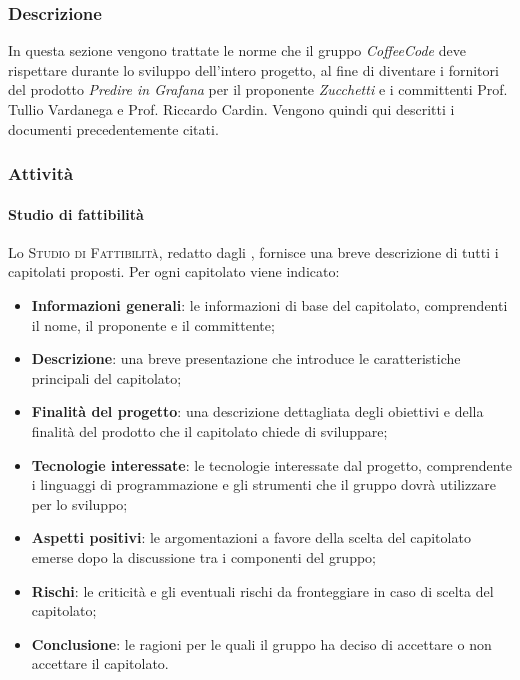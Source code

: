 \documentclass[../norme-di-progetto.tex]{subfiles}
\begin{document}
\subsubsection{Descrizione}
In questa sezione vengono trattate le norme che il gruppo \emph{CoffeeCode} deve rispettare durante lo sviluppo dell'intero progetto, al fine di diventare i fornitori del prodotto \emph{Predire in Grafana} per il proponente \emph{Zucchetti} e i committenti Prof. Tullio Vardanega e Prof. Riccardo Cardin. Vengono quindi qui descritti i documenti precedentemente citati.

\subsubsection{Attività}

\paragraph{Studio di fattibilità}
Lo \textsc{Studio di Fattibilità}, redatto dagli , fornisce una breve descrizione di tutti i capitolati proposti. Per ogni capitolato viene indicato:
\begin{itemize}
  \item \textbf{Informazioni generali}: le informazioni di base del capitolato, comprendenti il nome, il proponente e il committente;
  \item \textbf{Descrizione}: una breve presentazione che introduce le caratteristiche principali del capitolato;
  \item \textbf{Finalità del progetto}: una descrizione dettagliata degli obiettivi e della finalità del prodotto che il capitolato chiede di sviluppare;
  \item \textbf{Tecnologie interessate}: le tecnologie interessate dal progetto, comprendente i linguaggi di programmazione e gli strumenti che il gruppo dovrà utilizzare per lo sviluppo;
  \item \textbf{Aspetti positivi}: le argomentazioni a favore della scelta del capitolato emerse dopo la discussione tra i componenti del gruppo;
  \item \textbf{Rischi}: le criticità e gli eventuali rischi da fronteggiare in caso di scelta del capitolato;
  \item \textbf{Conclusione}: le ragioni per le quali il gruppo ha deciso di accettare o non accettare il capitolato.
\end{itemize}
\end{document}
